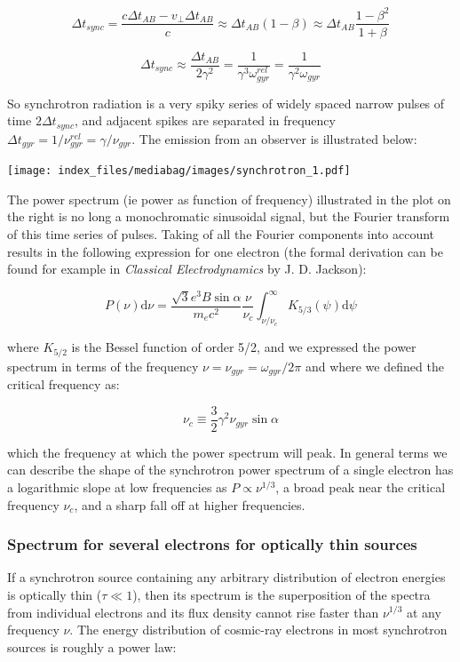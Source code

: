 \documentclass[
  letterpaper,
  DIV=11,
  numbers=noendperiod]{scrreprt}
\begin{document}
\[\Delta t_{sync} = \frac{c\Delta t_{AB} - v_\perp \Delta t_{AB}}{c} \approx \Delta t_{AB}( 1 - \beta) \approx  \Delta t_{AB} \frac{1 - \beta^2}{1 + \beta} \]

\[ \Delta t_{sync} \approx \frac{ \Delta t_{AB} }{2\gamma^2} = \frac{1}{\gamma^3 \omega_{gyr}^{rel}} = \frac{1}{\gamma^2 \omega_{gyr}} \]

So synchrotron radiation is a very spiky series of widely spaced narrow
pulses of time \(2\Delta t_{sync}\), and adjacent spikes are separated
in frequency \(\Delta t_{gyr} = 1/\nu^{rel}_{gyr} = \gamma/\nu_{gyr}\).
The emission from an observer is illustrated below:

\texttt{[image: index\_files/mediabag/images/synchrotron\_1.pdf]}

The power spectrum (ie power as function of frequency) illustrated in
the plot on the right is no long a monochromatic sinusoidal signal, but
the Fourier transform of this time series of pulses. Taking of all the
Fourier components into account results in the following expression for
one electron (the formal derivation can be found for example in
\emph{Classical Electrodynamics} by J. D. Jackson):

\[P(\nu)\mathrm{d}\nu = \frac{\sqrt{3}e^3B\sin\alpha}{m_ec^2}\frac{\nu}{\nu_c}\int_{\nu/\nu_c}^\infty K_{5/3}(\psi)\mathrm{d}\psi\]

where \(K_{5/2}\) is the Bessel function of order 5/2, and we expressed
the power spectrum in terms of the frequency
\(\nu = \nu_{gyr} =\omega_{gyr}/2\pi\) and where we defined the critical
frequency as:

\[\nu_c \equiv \frac{3}{2}\gamma^2\nu_{gyr} \sin \alpha\]

which the frequency at which the power spectrum will peak. In general
terms we can describe the shape of the synchrotron power spectrum of a
single electron has a logarithmic slope at low frequencies as
\(P \propto \nu^{1/3}\), a broad peak near the critical frequency
\(\nu_c\), and a sharp fall off at higher frequencies.

\subsubsection{Spectrum for several electrons for optically thin
sources}\label{spectrum-for-several-electrons-for-optically-thin-sources}

If a synchrotron source containing any arbitrary distribution of
electron energies is optically thin (\(\tau \ll 1\)), then its spectrum
is the superposition of the spectra from individual electrons and its
flux density cannot rise faster than \(\nu^{1/3}\) at any frequency
\(\nu\). The energy distribution of cosmic-ray electrons in most
synchrotron sources is roughly a power law:
\end{document}
